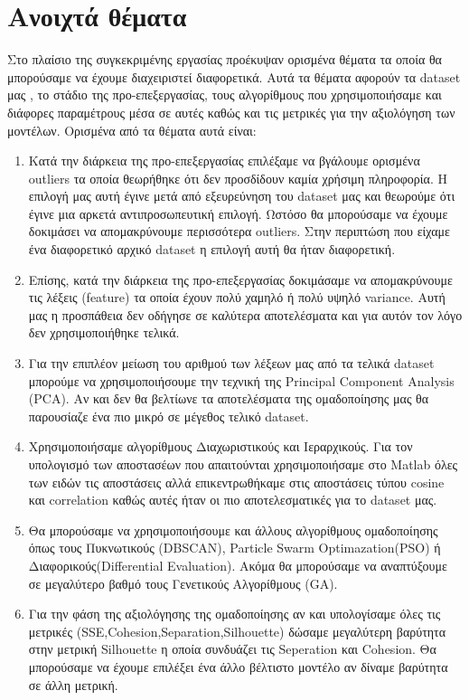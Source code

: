 \chapter{Ανοιχτά θέματα}
Στο πλαίσιο της συγκεκριμένης εργασίας προέκυψαν ορισμένα θέματα τα οποία θα μπορούσαμε να έχουμε διαχειριστεί διαφορετικά. Αυτά τα θέματα αφορούν τα dataset μας , το στάδιο της προ-επεξεργασίας, τους αλγορίθμους που χρησιμοποιήσαμε και διάφορες παραμέτρους μέσα σε αυτές καθώς και τις μετρικές για την αξιολόγηση των μοντέλων. Ορισμένα από τα θέματα αυτά είναι:

\begin{enumerate}
    \item Κατά την διάρκεια της προ-επεξεργασίας επιλέξαμε να βγάλουμε ορισμένα outliers τα οποία θεωρήθηκε ότι δεν προσδίδουν καμία χρήσιμη πληροφορία. Η επιλογή μας αυτή έγινε μετά από εξευρεύνηση του dataset μας και θεωρούμε ότι έγινε μια αρκετά αντιπροσωπευτική επιλογή. Ωστόσο θα μπορούσαμε να έχουμε δοκιμάσει να απομακρύνουμε περισσότερα outliers. Στην περιπτώση που είχαμε ένα διαφορετικό αρχικό dataset η επιλογή αυτή θα ήταν διαφορετική.
    \item Επίσης, κατά την διάρκεια της προ-επεξεργασίας δοκιμάσαμε να απομακρύνουμε τις λέξεις (feature) τα οποία έχουν πολύ χαμηλό ή πολύ υψηλό variance. Αυτή μας η προσπάθεια δεν οδήγησε σε καλύτερα αποτελέσματα και για αυτόν τον λόγο δεν χρησιμοποιήθηκε τελικά.
    \item Για την επιπλέον μείωση του αριθμού των λέξεων μας από τα τελικά dataset μπορούμε να χρησιμοποιήσουμε την τεχνική της Principal Component Analysis (PCA). Αν και δεν θα βελτίωνε τα αποτελέσματα της ομαδοποίησης μας θα παρουσίαζε ένα πιο μικρό σε μέγεθος τελικό dataset.
    \item Χρησιμοποιήσαμε αλγορίθμους Διαχωριστικούς και Ιεραρχικούς. Για τον υπολογισμό των αποστασέων που απαιτούνται χρησιμοποιήσαμε στο Matlab όλες των ειδών τις αποστάσεις αλλά επικεντρωθήκαμε στις αποστάσεις τύπου cosine και correlation καθώς αυτές ήταν οι πιο αποτελεσματικές για το dataset μας.
    \item Θα μπορούσαμε να χρησιμοποιήσουμε και άλλους αλγορίθμους ομαδοποίησης όπως τους Πυκνωτικούς (DBSCAN), Particle Swarm Optimazation(PSO) ή Διαφορικούς(Differential Evaluation). Ακόμα θα μπορούσαμε να αναπτύξουμε σε μεγαλύτερο βαθμό τους Γενετικούς Αλγορίθμους (GA).
    \item Για την φάση της αξιολόγησης της ομαδοποίησης αν και υπολογίσαμε όλες τις μετρικές (SSE,Cohesion,Separation,Silhouette) δώσαμε μεγαλύτερη βαρύτητα στην μετρική Silhouette η οποία συνδυάζει τις Seperation και Cohesion. Θα μπορούσαμε να έχουμε επιλέξει ένα άλλο βέλτιστο μοντέλο αν δίναμε βαρύτητα σε άλλη μετρική.

\end{enumerate}
